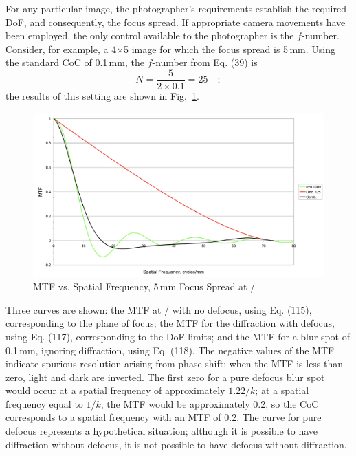 \documentclass[11pt, oneside]{scrartcl}   	%
\newcommand{\f}[1]{\mbox{\raisebox{2pt}{\footnotesize $f$\hspace{-1.2pt}}/\hspace{-0.6pt}\raisebox{-0.6pt}{\small #1}}}
\begin{document}
For any particular image, the photographer’s requirements establish the required DoF, and consequently, the focus spread. If appropriate camera movements have been employed, the only control available to the photographer is the $f$-number. Consider, for example, a 4×5 image for which the focus spread is 5\,mm. Using the standard CoC of 0.1\,mm, the $f$-number from Eq. (39) is
\begin{equation}
N = \frac5{2×0.1} = 25\quad; 
\end{equation}
the results of this setting are shown in Fig.~\ref{fig:MTFvssf25}.
\begin{figure}[htbp] %
   \centering
   \includegraphics[width=\linewidth]{figure/fig_dofd_7} 
   \caption{MTF vs. Spatial Frequency, 5\,mm Focus Spread at \f{25}}
   \label{fig:MTFvssf25}
\end{figure}
Three curves are shown: the MTF at \f{25} with no defocus, using Eq. (115), corresponding to the plane of focus; the MTF for the diffraction with defocus, using Eq. (117), corresponding to the DoF limits; and the MTF for a blur spot of 0.1\,mm, ignoring diffraction, using Eq. (118). The negative values of the MTF indicate spurious resolution arising from phase shift; when the MTF is less than zero, light and dark are inverted. The first zero for a pure defocus blur spot would occur at a spatial frequency of approximately $1.22/k$; at a spatial frequency equal to $1/k$, the MTF would be approximately 0.2, so the CoC corresponds to a spatial frequency with an MTF of 0.2. The curve for pure defocus represents a hypothetical situation; although it is possible to have diffraction without defocus, it is not possible to have defocus without diffraction.
\end{document}
